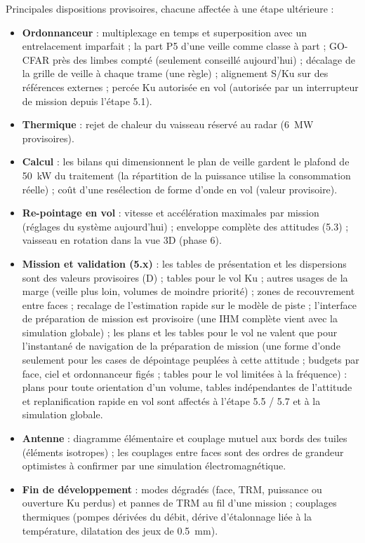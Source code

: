 \documentclass[11pt,a4paper]{article}
\begin{document}
Principales dispositions provisoires, chacune affectée à une étape ultérieure :
\begin{itemize}
  \item \textbf{Ordonnanceur} : multiplexage en temps et superposition avec un entrelacement imparfait ; la part P5
        d'une veille comme classe à part ; GO-CFAR près des limbes compté (seulement conseillé aujourd'hui) ; décalage
        de la grille de veille à chaque trame (une règle) ; alignement S/Ku sur des références externes ; percée Ku
        autorisée en vol (autorisée par un interrupteur de mission depuis l'étape 5.1).
  \item \textbf{Thermique} : rejet de chaleur du vaisseau réservé au radar (\SI{6}{MW} provisoires).
  \item \textbf{Calcul} : les bilans qui dimensionnent le plan de veille gardent le plafond de \SI{50}{kW} du traitement
        (la répartition de la puissance utilise la consommation réelle) ; coût d'une resélection de forme d'onde en vol
        (valeur provisoire).
  \item \textbf{Re-pointage en vol} : vitesse et accélération maximales par mission (réglages du système aujourd'hui) ;
        enveloppe complète des attitudes (5.3) ; vaisseau en rotation dans la vue 3D (phase 6).
  \item \textbf{Mission et validation (5.x)} : les tables de présentation et les dispersions sont des valeurs
        provisoires (D) ; tables pour le vol Ku ; autres usages de la marge (veille plus loin, volumes de moindre
        priorité) ; zones de recouvrement entre faces ; recalage de l'estimation rapide sur le modèle de piste ;
        l'interface de préparation de mission est provisoire (une IHM complète vient avec la simulation globale) ;
        les plans et les tables pour le vol ne valent que pour l'instantané de navigation de la préparation de mission
        (une forme d'onde seulement pour les cases de dépointage peuplées à cette attitude ; budgets par face, ciel et
        ordonnanceur figés ; tables pour le vol limitées à la fréquence) : plans pour toute orientation d'un volume,
        tables indépendantes de l'attitude et replanification rapide en vol sont affectés à l'étape 5.5 / 5.7 et à la
        simulation globale.
  \item \textbf{Antenne} : diagramme élémentaire et couplage mutuel aux bords des tuiles (éléments isotropes) ; les
        couplages entre faces sont des ordres de grandeur optimistes à confirmer par une simulation électromagnétique.
  \item \textbf{Fin de développement} : modes dégradés (face, TRM, puissance ou ouverture Ku perdus) et pannes de TRM
        au fil d'une mission ; couplages thermiques (pompes dérivées du débit, dérive d'étalonnage liée à la
        température, dilatation des jeux de \SI{0.5}{mm}).
\end{itemize}
\end{document}
